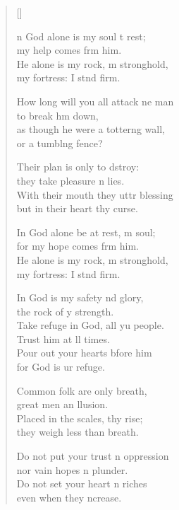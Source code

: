 \settowidth{\versewidth}{How long will you all attack one man *}
\begin{verse}[\versewidth]
  \begin{patverse}
n God alone is my soul t rest;\Med\\
my help comes frm him.\\
He alone is my rock, m stronghold,\Med\\
my fortress: I stnd firm.

How long will you all attack ne man\Med\\
to break h\pointup{\i}m down,\\
as though he were a totter\pointup{\i}ng wall,\Med\\
or a tumbl\pointup{\i}ng fence?

Their plan is only to dstroy:\Med\\
they take pleasure \pointup{\i}n lies.\\
With their mouth they uttr blessing\Med\\
but in their heart thy curse.

In God alone be at rest, m soul;\Med\\
for my hope comes frm him.\\
He alone is my rock, m stronghold,\Med\\
my fortress: I stnd firm.

In God is my safety nd glory,\Med\\
the rock of y strength.\\
Take refuge in God, all yu people.\Med\\
Trust him at ll times.\\
Pour out your hearts bfore him\Med\\
for God is ur refuge.

Common folk are only  breath,\Med\\
great men an \pointup{\i}llusion.\\
Placed in the scales, thy rise;\Med\\
they weigh less than  breath.

Do not put your trust \pointup{\i}n oppression\Med\\
nor vain hopes n plunder.\\
Do not set your heart n riches\Med\\
even when they \pointup{\i}ncrease.


\end{patverse}
\end{verse}
